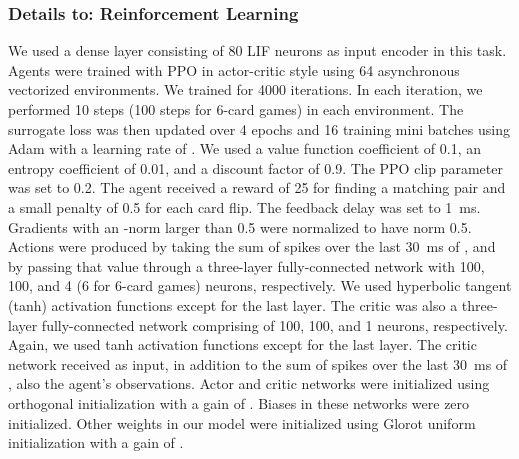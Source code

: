 \documentclass{article}
\begin{document}
\subsubsection*{Details to: Reinforcement Learning}
We used a dense layer consisting of \num{80} \gls{LIF} neurons as input encoder in this task. Agents were trained with \gls{PPO} \cite{schulman2017proximal} in actor-critic style using \num{64} asynchronous vectorized environments. We trained for \num{4000} iterations. In each iteration, we performed \num{10} steps (\num{100} steps for 6-card games) in each environment. The surrogate loss was then updated over \num{4} epochs and \num{16} training mini batches using Adam \cite{kingma2014adam} with a learning rate of . We used a value function coefficient of \num{0.1}, an entropy coefficient of \num{0.01}, and a discount factor of \num{0.9}. The \gls{PPO} clip parameter was set to \num{0.2}. The agent received a reward of \num{25} for finding a matching pair and a small penalty of \num{0.5} for each card flip. The feedback delay  was set to \SI{1}{ms}. Gradients with an -norm larger than \num{0.5} were normalized to have norm \num{0.5}. Actions were produced by taking the sum of spikes over the last \SI{30}{ms} of , and by passing that value through a three-layer fully-connected network with \num{100}, \num{100}, and \num{4} (\num{6} for 6-card games) neurons, respectively. We used hyperbolic tangent (tanh) activation functions except for the last layer. The critic was also a three-layer fully-connected network comprising of \num{100}, \num{100}, and \num{1} neurons, respectively. Again, we used tanh activation functions except for the last layer. The critic network received as input, in addition to the sum of spikes over the last \SI{30}{ms} of , also the agent's observations. Actor and critic networks were initialized using orthogonal initialization \cite{saxe14exactsolutions} with a gain of . Biases in these networks were zero initialized. Other weights in our model were initialized using Glorot uniform initialization \cite{glorot2010understanding} with a gain of .
\end{document}
